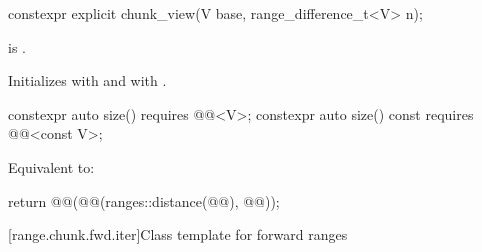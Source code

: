 \begin{itemdecl}
constexpr explicit chunk_view(V base, range_difference_t<V> n);
\end{itemdecl}

\begin{itemdescr}
\pnum
\expects
{} is .

\pnum
\effects
Initializes  with  and
 with .
\end{itemdescr}

\begin{itemdecl}
constexpr auto size() requires @@<V>;
constexpr auto size() const requires @@<const V>;
\end{itemdecl}

\begin{itemdescr}
\pnum
\effects
Equivalent to:
\begin{codeblock}
return @@(@@(ranges::distance(@@), @@));
\end{codeblock}
\end{itemdescr}

[range.chunk.fwd.iter]{Class template  for forward ranges}

